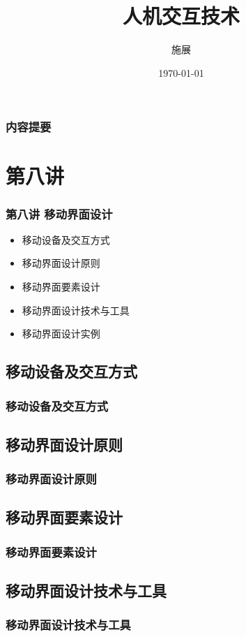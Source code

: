 \documentclass{beamer}
\title{人机交互技术}
\author{施展}
\institute{华中科技大学~武汉光电国家实验室}
\date{\today}
\begin{document}
\begin{frame}
	\titlepage
\end{frame}

\begin{frame}
	\frametitle{内容提要}
	\tableofcontents
\end{frame}

\section{第八讲}
\begin{frame}
	\frametitle{第八讲 移动界面设计}
	\begin{itemize}
		\item 移动设备及交互方式
		\item 移动界面设计原则
		\item 移动界面要素设计
		\item 移动界面设计技术与工具
		\item 移动界面设计实例
	\end{itemize}
\end{frame}

\subsection{移动设备及交互方式}
\begin{frame}
	\frametitle{移动设备及交互方式}

\end{frame}

\subsection{移动界面设计原则}
\begin{frame}
	\frametitle{移动界面设计原则}

\end{frame}

\subsection{移动界面要素设计}
\begin{frame}
	\frametitle{移动界面要素设计}

\end{frame}

\subsection{移动界面设计技术与工具}
\begin{frame}
	\frametitle{移动界面设计技术与工具}

\end{frame}
\end{document}
